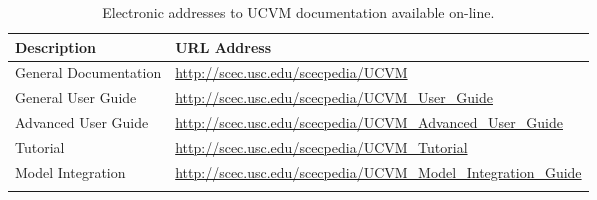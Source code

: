 
\begin{table*}[t]
\centering
\small
\caption{Electronic addresses to UCVM documentation available on-line.}
\begin{tabular}[]{ll}
Description                 & URL Address                                                         \\
\hline
General Documentation       & \url{http://scec.usc.edu/scecpedia/UCVM}                            \\
General User Guide          & \url{http://scec.usc.edu/scecpedia/UCVM_User_Guide}                 \\
Advanced User Guide         & \url{http://scec.usc.edu/scecpedia/UCVM_Advanced_User_Guide}        \\
Tutorial                    & \url{http://scec.usc.edu/scecpedia/UCVM_Tutorial}                   \\
Model Integration           & \url{http://scec.usc.edu/scecpedia/UCVM_Model_Integration_Guide}    \\
\hline
\\
\end{tabular}
\label{tab:manuals}
\end{table*}
